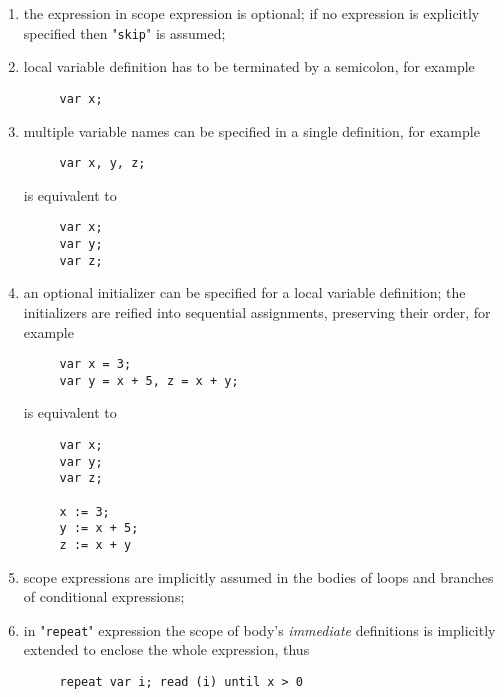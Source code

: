 \documentclass{article}
\theoremstyle{definition}
\begin{document}
\begin{enumerate}
\item the expression in scope expression is optional; if no expression is explicitly specified then "\lstinline|skip|" is assumed;
\item local variable definition has to be terminated by a semicolon, for example

  \begin{lstlisting}
     var x;
  \end{lstlisting}

\item multiple variable names can be specified in a single definition, for example

  \begin{lstlisting}
     var x, y, z;
  \end{lstlisting}

  is equivalent to

  \begin{lstlisting}
     var x;
     var y;
     var z;
  \end{lstlisting}

\item an optional initializer can be specified for a local variable definition; the initializers are reified into sequential assignments,
  preserving their order, for example

  \begin{lstlisting}
     var x = 3;
     var y = x + 5, z = x + y;
  \end{lstlisting}

  is equivalent to

  \begin{lstlisting}
     var x;
     var y;
     var z;

     x := 3;
     y := x + 5;
     z := x + y
  \end{lstlisting}

\item scope expressions are implicitly assumed in the bodies of loops and branches of conditional expressions;

\item in "\lstinline|repeat|" expression the scope of body's \emph{immediate} definitions is implicitly extended to enclose the
  whole expression, thus

  \begin{lstlisting}
     repeat var i; read (i) until x > 0
  \end{lstlisting}


\end{enumerate}
\end{document}
